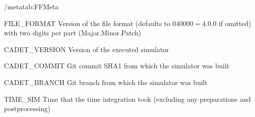 \begin{groupscope}{/meta}{tab:FFMeta}
  \begin{dataset}[type=int,inout={In}]{FILE\_FORMAT}
    Version of the file format (defaults to $040000 = 4.0.0$ if omitted) with two digits per part (Major.Minor.Patch)
  \end{dataset}
  \begin{dataset}[type=string,inout={Out}]{CADET\_VERSION}
    Version of the executed \CADET{} simulator
  \end{dataset}
  \begin{dataset}[type=string,inout={Out}]{CADET\_COMMIT}
    Git commit SHA1 from which the \CADET{} simulator was built
  \end{dataset}
  \begin{dataset}[type=string,inout={Out}]{CADET\_BRANCH}
    Git branch from which the \CADET{} simulator was built
  \end{dataset}
  \begin{dataset}[type=double,unit={\si{\second}},inout={Out}]{TIME\_SIM}
    Time that the time integration took (excluding any preparations and postprocessing)
  \end{dataset}
\end{groupscope}
